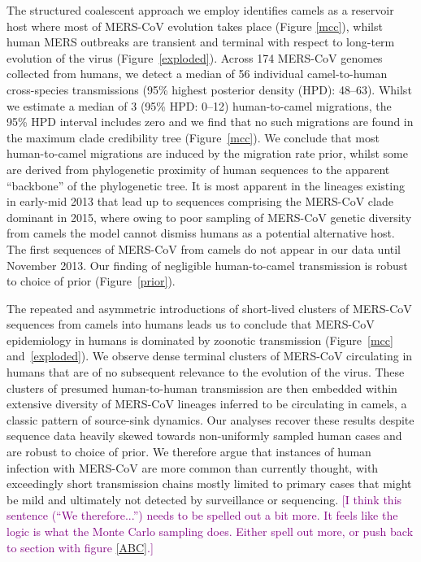 \documentclass[11pt,oneside,letterpaper]{article}
\def\tbc#1{\textcolor{purple}{[#1]}}
\def\gdc#1{\textcolor{blue}{[#1]}}
\def\lmc#1{\textcolor{green}{[#1]}}
\begin{document}
The structured coalescent approach we employ \citep{vaughan_efficient_2014} identifies camels as a reservoir host where most of MERS-CoV evolution takes place (Figure \ref{mcc}), whilst human MERS outbreaks are transient and terminal with respect to long-term evolution of the virus (Figure~\ref{exploded}).
Across 174 MERS-CoV genomes collected from humans, we detect a median of 56 individual camel-to-human cross-species transmissions (95\% highest posterior density (HPD): 48--63).
Whilst we %
estimate a median of 3 (95\% HPD: 0--12) human-to-camel migrations, the 95\% HPD interval includes zero and we find that no such migrations are found in the maximum clade credibility tree (Figure~\ref{mcc}).
We conclude that most human-to-camel migrations are induced by the migration rate prior, whilst some are derived from phylogenetic proximity of human sequences to the apparent ``backbone'' of the phylogenetic tree.
It is most apparent in the lineages existing in early-mid 2013 that lead up to sequences comprising the MERS-CoV clade dominant in 2015, where owing to poor sampling of MERS-CoV genetic diversity from camels the model cannot dismiss humans as a potential alternative host.
The first sequences of MERS-CoV from camels do not appear in our data until November 2013.
Our finding of negligible human-to-camel transmission is robust to choice of prior (Figure~\ref{prior}).

The repeated and asymmetric introductions of short-lived clusters of MERS-CoV sequences from camels into humans leads us to conclude that MERS-CoV epidemiology in humans is dominated by zoonotic transmission (Figure~\ref{mcc} and~\ref{exploded}).
We observe dense terminal clusters of MERS-CoV circulating in humans that are of no subsequent relevance to the evolution of the virus.
These clusters of presumed human-to-human transmission are then embedded within extensive diversity of MERS-CoV lineages inferred to be circulating in camels, a classic pattern of source-sink dynamics.
Our analyses recover these results despite sequence data heavily skewed towards non-uniformly %
sampled human cases and are robust to choice of prior.
We therefore argue that instances of human infection with MERS-CoV are more common than currently thought, with exceedingly short transmission chains mostly limited to primary cases that might be mild and ultimately not detected by surveillance or sequencing.
\tbc{I think this sentence (``We therefore...'') needs to be spelled out a bit more. It feels like the logic is what the Monte Carlo sampling does. Either spell out more, or push back to section with figure \ref{ABC}.}
\end{document}
